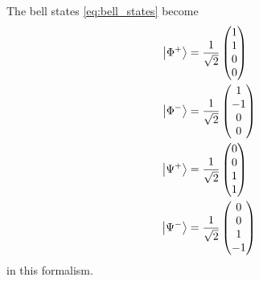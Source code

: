 The bell states \eqref{eq:bell_states} become
\begin{subequations}
\label{eq:bell_formalism}
\begin{align}
\ket{\Phi^{+}}
    &=\frac{1}{\sqrt{2}}\begin{pmatrix}1\\1\\0\\0\end{pmatrix}
    \label{eq:bell_formalism:phip}\\
\ket{\Phi^{-}}
    &=\frac{1}{\sqrt{2}}\begin{pmatrix}1\\-1\\0\\0\end{pmatrix}
    \label{eq:bell_formalism:phim}\\
\ket{\Psi^{+}}
    &=\frac{1}{\sqrt{2}}\begin{pmatrix}0\\0\\1\\1\end{pmatrix}
    \label{eq:bell_formalism:psip}\\
\ket{\Psi^{-}}
    &=\frac{1}{\sqrt{2}}\begin{pmatrix}0\\0\\1\\-1\end{pmatrix}
    \label{eq:bell_formalism:psim}
\end{align}
\end{subequations}
in this formalism.